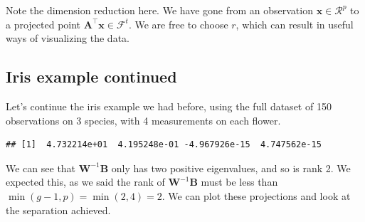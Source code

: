 \documentclass[
]{book}
\newenvironment{Shaded}{\begin{snugshade}}{\end{snugshade}}
\newcommand{\DecValTok}[1]{\textcolor[rgb]{0.00,0.00,0.81}{#1}}
\newcommand{\FunctionTok}[1]{\textcolor[rgb]{0.13,0.29,0.53}{\textbf{#1}}}
\newcommand{\NormalTok}[1]{#1}
\newcommand{\OtherTok}[1]{\textcolor[rgb]{0.56,0.35,0.01}{#1}}
\newcommand{\SpecialCharTok}[1]{\textcolor[rgb]{0.81,0.36,0.00}{\textbf{#1}}}
\theoremstyle{definition}
\theoremstyle{definition}
\theoremstyle{definition}
\theoremstyle{definition}
\theoremstyle{remark}
\begin{document}
Note the dimension reduction here. We have gone from an observation \(\mathbf x\in \mathcal{R}^p\) to a projected point \(\mathbf A^\top\mathbf x\in \mathcal{F}^t\). We are free to choose \(r\), which can result in useful ways of visualizing the data.

\subsection{Iris example continued}\label{iris-example-continued-1}

Let's continue the iris example we had before, using the full dataset of 150 observations on 3 species, with 4 measurements on each flower.

\begin{Shaded}
\end{Shaded}

\begin{verbatim}
## [1]  4.732214e+01  4.195248e-01 -4.967926e-15  4.747562e-15
\end{verbatim}

We can see that \(\mathbf W^{-1}\mathbf B\) only has two positive eigenvalues, and so is rank 2. We expected this, as we said the rank of \(\mathbf W^{-1}\mathbf B\) must be less than \(\min(g-1,p)= \min(2,4)=2\). We can plot these projections and look at the separation achieved.
\end{document}
